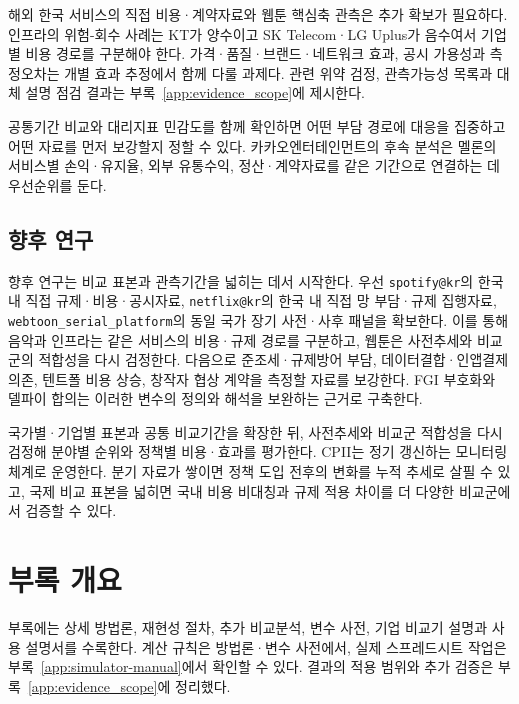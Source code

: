 \documentclass[11pt,a4paper]{report}
\begin{document}
해외 한국 서비스의 직접 비용·계약자료와 웹툰 핵심축 관측은 추가 확보가 필요하다. 인프라의 위험-회수 사례는 KT가 양수이고 SK Telecom·LG Uplus가 음수여서 기업별 비용 경로를 구분해야 한다. 가격·품질·브랜드·네트워크 효과, 공시 가용성과 측정오차는 개별 효과 추정에서 함께 다룰 과제다. 관련 위약 검정, 관측가능성 목록과 대체 설명 점검 결과는 부록~\ref{app:evidence_scope}에 제시한다.

공통기간 비교와 대리지표 민감도를 함께 확인하면 어떤 부담 경로에 대응을 집중하고 어떤 자료를 먼저 보강할지 정할 수 있다. 카카오엔터테인먼트의 후속 분석은 멜론의 서비스별 손익·유지율, 외부 유통수익, 정산·계약자료를 같은 기간으로 연결하는 데 우선순위를 둔다.

\section{향후 연구}
향후 연구는 비교 표본과 관측기간을 넓히는 데서 시작한다. 우선 \nolinkurl{spotify@kr}의 한국 내 직접 규제·비용·공시자료, \nolinkurl{netflix@kr}의 한국 내 직접 망 부담·규제 집행자료, \nolinkurl{webtoon_serial_platform}의 동일 국가 장기 사전·사후 패널을 확보한다. 이를 통해 음악과 인프라는 같은 서비스의 비용·규제 경로를 구분하고, 웹툰은 사전추세와 비교군의 적합성을 다시 검정한다. 다음으로 준조세·규제방어 부담, 데이터결합·인앱결제 의존, 텐트폴 비용 상승, 창작자 협상 계약을 측정할 자료를 보강한다. FGI 부호화와 델파이 합의는 이러한 변수의 정의와 해석을 보완하는 근거로 구축한다.

국가별·기업별 표본과 공통 비교기간을 확장한 뒤, 사전추세와 비교군 적합성을 다시 검정해 분야별 순위와 정책별 비용·효과를 평가한다. CPII는 정기 갱신하는 모니터링 체계로 운영한다. 분기 자료가 쌓이면 정책 도입 전후의 변화를 누적 추세로 살필 수 있고, 국제 비교 표본을 넓히면 국내 비용 비대칭과 규제 적용 차이를 더 다양한 비교군에서 검증할 수 있다.

\appendix

\chapter{부록 개요}
부록에는 상세 방법론, 재현성 절차, 추가 비교분석, 변수 사전, 기업 비교기 설명과 사용 설명서를 수록한다. 계산 규칙은 방법론·변수 사전에서, 실제 스프레드시트 작업은 부록~\ref{app:simulator-manual}에서 확인할 수 있다. 결과의 적용 범위와 추가 검증은 부록~\ref{app:evidence_scope}에 정리했다.
\end{document}
